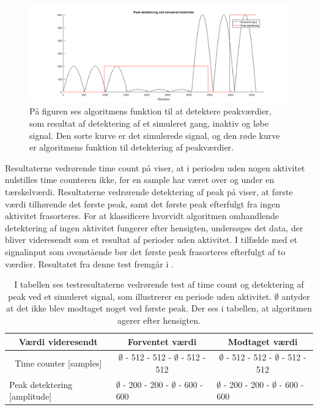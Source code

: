 \begin{figure}[H]
	\centering
	\includegraphics[width=.9\textwidth]{figures/cDesign/test_peak_inaktiv.png}
	\caption{På figuren ses algoritmens funktion til at detektere peakværdier, som resultat af detektering af et simuleret gang, inaktiv og løbe signal. Den sorte kurve er det simulerede signal, og den røde kurve er algoritmens funktion til detektering af peakværdier. }
	\label{fig:test_inaktiv_peak}
\end{figure}
Resultaterne vedrørende time count på  viser, at i perioden uden nogen aktivitet nulstilles time counteren ikke, før en sample har været over og under en tærskelværdi. Resultaterne vedrørende detektering af peak på  viser, at første værdi tilhørende det første peak, samt det første peak efterfulgt fra ingen aktivitet frasorteres. For at klassificere hvorvidt algoritmen omhandlende detektering af ingen aktivitet fungerer efter hensigten, undersøges det data, der bliver videresendt som et resultat af perioder uden aktivitet. I tilfælde med et signalinput som ovenstående bør det første peak frasorteres efterfulgt af to værdier. Resultatet fra denne test fremgår i . %
\begin{table}[H]
	\centering
	\begin{tabular}{ccc}
		\hline
		\rowcolor[HTML]{C0C0C0} 
		Værdi videresendt & Forventet værdi & Modtaget værdi \\ \hline
		Time counter [samples] & $\emptyset$ - 512 - 512 - $\emptyset$ - 512 - 512 & $\emptyset$ - 512 - 512 - $\emptyset$ - 512 - 512 \\ \hline
		\multicolumn{1}{l}{Peak detektering [amplitude]} &     \multicolumn{1}{l}{$\emptyset$ - 200 - 200 - $\emptyset$ - 600 - 600}     &     \multicolumn{1}{l}{$\emptyset$ - 200 - 200 - $\emptyset$ - 600 - 600} \\ \hline
	\end{tabular}
	\caption{I tabellen ses testresultaterne vedrørende test af time count og detektering af peak ved et simuleret signal, som illustrerer en periode uden aktivitet. $\emptyset$ antyder at det ikke blev modtaget noget ved første peak. Der ses i tabellen, at algoritmen agerer efter hensigten.}
	\label{tab:test_inaktiv}
\end{table}\vspace{-0.5cm}
